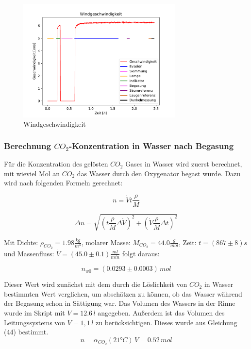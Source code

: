 \documentclass[12pt]{article}
\begin{document}
\begin{figure}[H]
	\centering
	\parbox{82.5mm}{
		\centering
		\includegraphics[width=82.5mm]{VE-Wasser/Windgeschwindigkeit}
		\caption{Windgeschwindigkeit}
	}
	\hfill%
	\parbox{82.5mm}{
		\centering
	}
\end{figure}

\subsubsection{Berechnung $CO_2$-Konzentration in Wasser nach Begasung}

Für die Konzentration des gelösten $CO_2$ Gases in Wasser wird zuerst berechnet, mit wieviel Mol an $CO_2$ das Wasser durch den Oxygenator begast wurde. Dazu wird nach folgenden Formeln gerechnet:

\begin{equation}
n = \dot V t \frac{\rho}{M}
\end{equation}

\begin{equation}
\Delta n = \sqrt{(t \frac{\rho}{M} \Delta \dot V)^{2}+(\dot V \frac{\rho}{M} \Delta t)^{2}}
\end{equation}

Mit Dichte: $\rho_{CO_2} = 1.98 \frac{kg}{m^3} $, molarer Masse: $M_{CO_2} = 44.0\frac{g}{mol} $, Zeit:  $t = (867 \pm 8)s$ und Massenfluss: $\dot V = (45.0 \pm 0.1)\frac{ml}{min}$ folgt daraus:

\begin{equation}
n_{w0} = (0.0293 \pm 0.0003) \,mol
\end{equation}

Dieser Wert wird zun\"achst mit dem durch die Löslichkeit von $CO_2$ in Wasser bestimmten Wert verglichen, um absch\"atzen zu können, ob das Wasser w\"ahrend der Begasung schon in S\"attigung war. Das Volumen des Wassers in der Rinne wurde im Skript mit $V = 12.6 \,l $ angegeben. Außerdem ist das Volumen des Leitungssystems von $V=1,1 \,l $ zu ber\"ucksichtigen. Dieses wurde aus Gleichung (44) \cite{jaehne} bestimmt.
\begin{equation}
n = \alpha_{CO_2}(21 °C) \, V = 0.52 \, mol
\end{equation}
\end{document}
